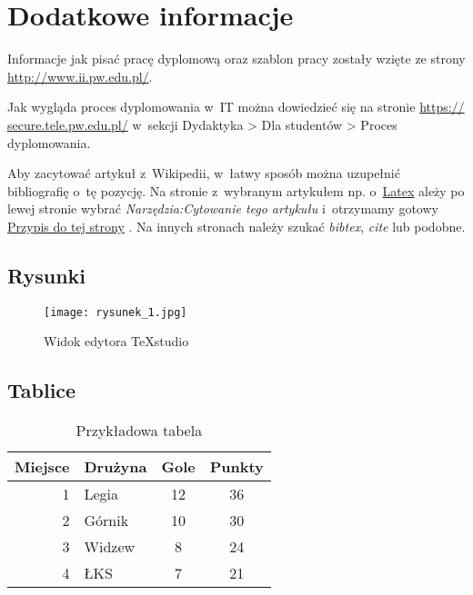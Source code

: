 \section{Dodatkowe informacje}
Informacje jak pisać pracę dyplomową oraz szablon pracy zostały wzięte ze strony \href{http://www.ii.pw.edu.pl/ii_pol/Instytut-Informatyki/Nauczanie/Poradnik-dyplomanta/Przygotowanie-pracy-dyplomowej}{http://www.ii.pw.edu.pl/}.

Jak wygląda proces dyplomowania w~IT można dowiedzieć się na stronie \href{https://secure.tele.pw.edu.pl/wp-content/uploads/2017/06/PROCES-DYPLOMOWANIA-17L.pdf}{https:// secure.tele.pw.edu.pl/} w~sekcji Dydaktyka > Dla studentów > Proces dyplomowania.

Aby zacytować artykuł z~Wikipedii, w~łatwy sposób można uzupełnić bibliografię o~tę pozycję. Na stronie z~wybranym artykułem np. o~\href{https://pl.wikipedia.org/wiki/LaTeX}{Latex} ależy po lewej stronie  wybrać 
\textit{Narzędzia:Cytowanie tego artykułu} i~otrzymamy gotowy 
 \href{https://pl.wikipedia.org/w/index.php?title=Specjalna:Cytuj&page=LaTeX&id=58147357}{Przypis do tej strony} \cite{Wiki:Latex}. Na innych stronach należy szukać \textit{bibtex}, \textit{cite} lub podobne.

\subsection{Rysunki}
\begin{figure}[h]
\centering
\texttt{[image: rysunek\_1.jpg]}
\caption{\label{fig:rysunek_1}Widok edytora TeXstudio \cite{TeXstudio}}
\end{figure}
\FloatBarrier %

\subsection{Tablice}
\begin{table}[h]
	\begin{center}
\caption{Przykładowa tabela}
\label{tab:tabela_przyklad}
\begin{tabular}{|r|l|c|c|}
	\hline 
	Miejsce & Drużyna & Gole & Punkty \\
	\hline \hline
	1 & Legia & 12 & 36 \\
	2 & Górnik & 10 & 30 \\
	3 & Widzew & 8 & 24\\
	4 & ŁKS & 7 & 21 \\ \hline
\end{tabular}
\end{center}
\end{table}
\FloatBarrier %

